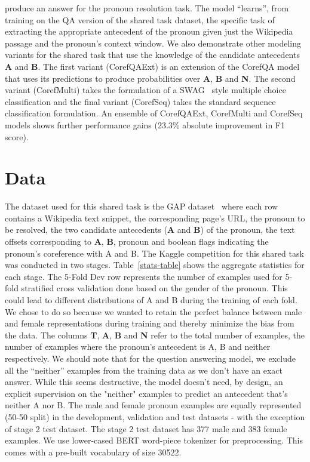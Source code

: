 \documentclass[11pt,a4paper]{article}
\begin{document}
produce an answer for the pronoun resolution task. The model ``learns'', from training on the QA version of the shared task dataset, the specific task of extracting the appropriate antecedent of the pronoun given just the Wikipedia passage and the pronoun's context window. We also demonstrate other modeling variants for the shared task that use the knowledge of the candidate antecedents \textbf{A} and \textbf{B}. The first variant (CorefQAExt) is an extension of the CorefQA model that uses its predictions to produce probabilities over \textbf{A}, \textbf{B} and \textbf{N}. The second variant (CorefMulti) takes the formulation of a SWAG~\cite{zellers2018swag} style multiple choice classification and the final variant (CorefSeq) takes the standard sequence classification formulation. An ensemble of CorefQAExt, CorefMulti and CorefSeq models shows further performance gains (23.3\% absolute improvement in F1 score).

\section{Data}

The dataset used for this shared task is the GAP dataset~\cite{webster2018gap} where each row contains a Wikipedia text snippet, the corresponding page's URL, the pronoun to be resolved, the two candidate antecedents (\textbf{A} and \textbf{B}) of the pronoun, the text offsets corresponding to \textbf{A}, \textbf{B}, pronoun and boolean flags indicating the pronoun's coreference with A and B. The Kaggle competition for this shared task was conducted in two stages. Table~\ref{stats-table} shows the aggregate statistics for each stage. The 5-Fold Dev row represents the number of examples used for 5-fold stratified cross validation done based on the gender of the pronoun. This could lead to different distributions of A and B during the training of each fold. We chose to do so because we wanted to retain the perfect balance between male and female representations during training and thereby minimize the bias from the data. The columns \textbf{T}, \textbf{A}, \textbf{B} and \textbf{N} refer to the total number of examples, the number of examples where the pronoun's antecedent is A, B and neither respectively. We should note that for the question answering model, we exclude all the “neither” examples from the training data as we don’t have an exact answer. While this seems destructive, the model doesn't need, by design, an explicit supervision on the "neither" examples to predict an antecedent that's neither A nor B. The male and female pronoun examples are equally represented (50-50 split) in the development, validation and test datasets - with the exception of stage 2 test dataset. The stage 2 test dataset has 377 male and 383 female examples. We use lower-cased BERT word-piece tokenizer for preprocessing. This comes with a pre-built vocabulary of size 30522.
\end{document}
